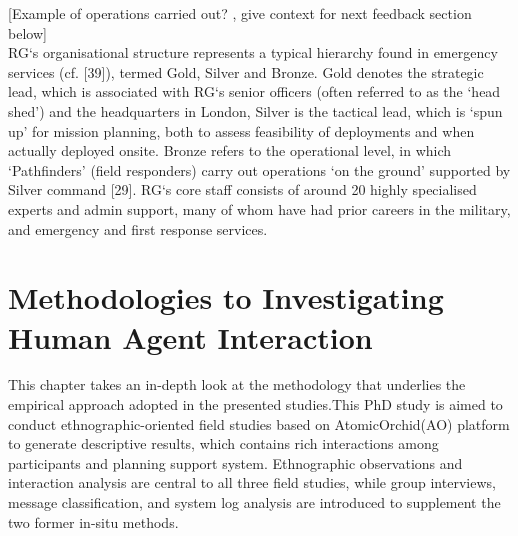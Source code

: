 [Example of operations carried out? , give context for next feedback section below]\\

RG`s organisational structure represents a typical hierarchy found in emergency services (cf. [39]), termed Gold, Silver and Bronze. Gold denotes the strategic lead, which is associated with RG`s senior officers (often referred to as the `head shed') and the headquarters in London, Silver is the tactical lead, which is `spun up' for mission planning, both to assess feasibility of deployments and when actually deployed onsite. Bronze refers to the operational level, in which `Pathfinders' (field responders) carry out operations `on the ground' supported by Silver command [29]. RG`s core staff consists of around 20 highly specialised experts and admin support, many of whom have had prior careers in the military, and emergency and first response services.\\






\chapter{ Methodologies to Investigating Human Agent Interaction}
This chapter takes an in-depth look at the methodology that underlies the empirical approach adopted in the presented studies.This PhD study is aimed to conduct ethnographic-oriented field studies based on AtomicOrchid(AO) platform to generate descriptive results, which contains rich interactions among participants and planning support system. Ethnographic observations and interaction analysis are central to all three field studies, while group interviews, message classification, and system log analysis are introduced to supplement the two former in-situ methods.\\

